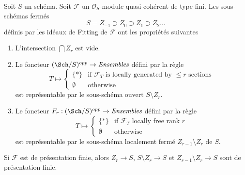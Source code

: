 \begin{lemma}
\label{lemma-locally-free-rank-r-pullback}
Soit  $S$  un schéma. Soit  $\mathcal{F}$  un  $\mathcal{O}_S$-module
quasi-cohérent de type fini. Les sous-schémas fermés
$$
S = Z_{-1} \supset Z_0 \supset Z_1 \supset Z_2 \ldots
$$
définis par les idéaux de Fitting de  $\mathcal{F}$  ont les propriétés suivantes
\begin{enumerate}
\item L’intersection  $\bigcap Z_r$  est vide.
\item Le foncteur  $(\Sch/S)^{opp} \to \textit{Ensembles}$  défini par la règle
$$
T \longmapsto
\left\{
\begin{matrix}
\{*\} & \text{if }\mathcal{F}_T\text{ is locally generated by }
\leq r\text{ sections} \\
\emptyset & \text{otherwise}
\end{matrix}
\right.
$$
est représentable par le sous-schéma ouvert  $S \setminus Z_r$.
\item Le foncteur  $F_r : (\Sch/S)^{opp} \to \textit{Ensembles}$  défini par la règle
$$
T \longmapsto
\left\{
\begin{matrix}
\{*\} & \text{if }\mathcal{F}_T\text{ locally free rank }r\\
\emptyset & \text{otherwise}
\end{matrix}
\right.
$$
est représentable par le sous-schéma localement fermé  $Z_{r - 1} \setminus Z_r$  de
 $S$.
\end{enumerate}
Si  $\mathcal{F}$  est de présentation finie, alors  $Z_r \to S$,  $S \setminus Z_r \to S$ et
 $Z_{r - 1} \setminus Z_r \to S$  sont de présentation finie.
\end{lemma}

